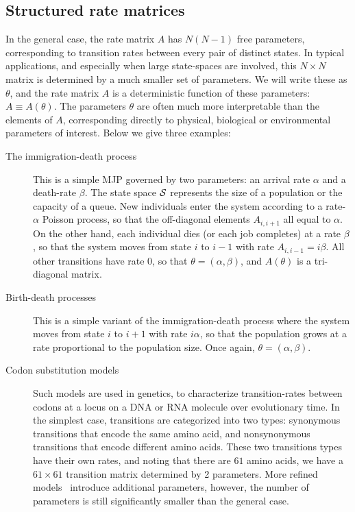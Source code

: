 \subsection{Structured rate matrices}
In the general case, the rate matrix $A$ has $N(N-1)$ free parameters,
corresponding to transition rates between every pair of distinct states. 
In typical applications, and especially when large state-spaces
are involved, this $N \times N$ matrix is determined by a much smaller
set of parameters. We will write these as $\theta$, and the rate 
matrix $A$ is a deterministic function of these parameters: 
$A \equiv A(\theta)$. The parameters $\theta$ are often much more 
interpretable than the elements of $A$, corresponding directly to
physical, biological or environmental parameters of interest. 
Below we give three examples:
\begin{description}
  \item[The immigration-death process] This is a simple MJP governed
    by two parameters: an arrival rate $\alpha$ and a death-rate
    $\beta$. The state space ${\mathcal S}$ represents the size of a 
    population or the capacity of a queue. New individuals
    enter the system according to a rate-$\alpha$ Poisson process,
    so that the off-diagonal elements $A_{i,i+1}$ all equal to $\alpha$.
    On the other hand, each individual dies (or each job completes) 
    at a rate $\beta$, so that the system moves from state $i$ to 
    $i-1$ with rate $A_{i,i-1}=i\beta$.
    All other transitions have rate $0$, so that $\theta = (\alpha,\beta)$,
    and $A(\theta)$ is a tri-diagonal matrix.
  \item[Birth-death processes] This is a simple variant of the
    immigration-death process where the system moves from state $i$ 
    to $i+1$ with rate $i\alpha$, so that the population grows at a 
    rate proportional to the population size. Once again, 
    $\theta=(\alpha,\beta)$.
  \item[Codon substitution models] Such models are used in genetics,
    to characterize transition-rates between codons at a locus on
    a DNA or RNA molecule over evolutionary time. In the simplest case,
    transitions are categorized into two types: synonymous transitions
    that encode the same amino acid, and nonsynonymous 
    transitions that encode different amino acids. 
    These two transitions types have their own rates, and noting that 
    there are $61$ amino acids, we have a $61\times 61$ transition
    matrix determined by 2 parameters. More refined models~\cite[e.g.][]{goldman1994codon} introduce
    additional parameters, however, the number of parameters is still
    significantly smaller than the general case.
\end{description}
